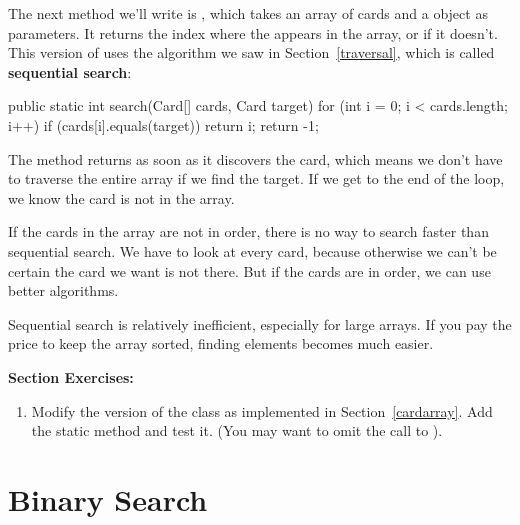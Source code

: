 
The next method we'll write is , which takes an array of cards and a  object as parameters.
It returns the index where the  appears in the array, or  if it doesn't.
This version of  uses the algorithm we saw in Section~\ref{traversal}, which is called {\bf sequential search}:


\begin{code}
public static int search(Card[] cards, Card target) {
    for (int i = 0; i < cards.length; i++) {
        if (cards[i].equals(target)) {
            return i;
        }
    }
    return -1;
}
\end{code}


The method returns as soon as it discovers the card, which means we don't have to traverse the entire array if we find the target.
If we get to the end of the loop, we know the card is not in the array.


If the cards in the array are not in order, there is no way to search faster than sequential search.
We have to look at every card, because otherwise we can't be certain the card we want is not there.
But if the cards are in order, we can use better algorithms.

Sequential search is relatively inefficient, especially for large arrays.
If you pay the price to keep the array sorted, finding elements becomes much easier.

\textbf{Section Exercises:}
\begin{enumerate}
\item Modify the version of the  class as implemented in Section~\ref{cardarray}.  Add the static  method and test it.  (You may want to omit the call to ).
\end{enumerate}

\section{Binary Search}


